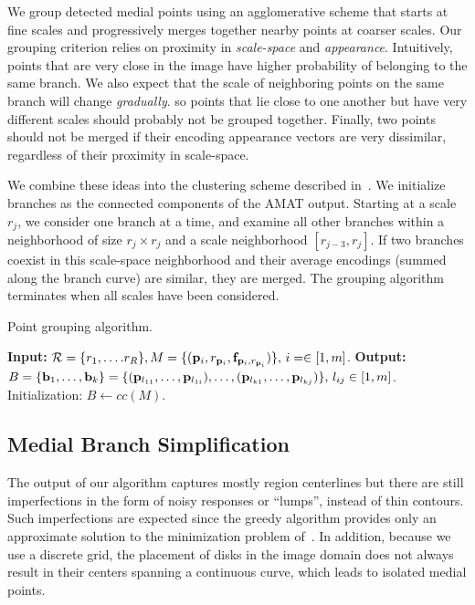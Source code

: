 \documentclass[10pt,twocolumn,letterpaper]{article}
\begin{document}
We group detected medial points using an agglomerative scheme that starts at fine scales and
progressively merges together nearby points at coarser scales.
Our grouping criterion relies on proximity in \emph{scale-space} and \emph{appearance}.
Intuitively, points that are very close in the image have higher probability of belonging to the
same branch.
We also expect that the scale of neighboring points on the same branch will change \emph{gradually}.
so points that lie close to one another but have very different scales should probably not be grouped together.
Finally, two points should not be merged if their encoding appearance vectors are very dissimilar,
regardless of their proximity in scale-space. 

We combine these ideas into the clustering scheme described in~.
We initialize branches as the connected components of the AMAT output.
Starting at a scale $r_j$, we consider one branch at a time, and examine all other
branches within a neighborhood of size $r_j \times r_j$ and a scale neighborhood $[r_{j-3},r_j]$.
If two branches coexist in this scale-space neighborhood and their average encodings 
(summed along the branch curve) are similar, they are merged.
The grouping algorithm terminates when all scales have been considered.

\begin{algorithm}[t]
\caption{Point grouping algorithm.}
\label{alg:grouping}
	\begin{algorithmic}[1]
	\Statex \textbf{Input:} $\set{R}=\{ r_1,\ldots.r_R \}, \newline M=\{ (\p{i},r_{\p{i}},\mathbf{f}_{\p{i},r_{\p{i}}}) \}, \, i=\in[1,m]$.
	\Statex \textbf{Output:} $B= \{ \mathbf{b}_1,\ldots,\mathbf{b}_k \} = \newline \{ (\p{l_{11}},\ldots,\p{l_{1i}}), \ldots, (\p{l_{k1}},\ldots,\p{l_{kj}}) \},\, l_{ij}\in[1,m]$.
	\State Initialization: $B \leftarrow cc(M)$. 
		\EndFor
	\EndFor
	\end{algorithmic}
\end{algorithm}


\subsection{Medial Branch Simplification}\label{sec:method:simplification}
The output of our algorithm captures mostly region centerlines but there are still
imperfections in the form of noisy responses or ``lumps'', instead of thin contours.
Such imperfections are expected since the greedy algorithm provides only an approximate solution
to the minimization problem of~. 
In addition, because we use a discrete grid, the placement of disks 
in the image domain does not always result in their centers spanning a continuous curve, 
which leads to isolated medial points.
\end{document}
